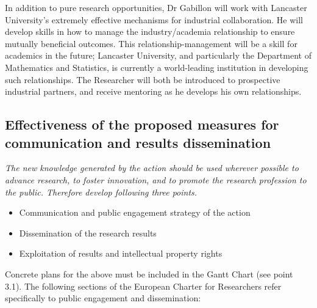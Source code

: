 \documentclass[a4paper,11pt]{article}
\begin{document}
In addition to pure research opportunities, Dr Gabillon will work with Lancaster University's extremely effective mechanisms for industrial collaboration.  He will develop skills in how to manage the industry/academia relationship to ensure mutually beneficial outcomes.  This relationship-management will be a skill for academics in the future; Lancaster University, and particularly the Department of Mathematics and Statistics, is currently a world-leading institution in developing such relationships.  The Researcher will both be introduced to prospective industrial partners, and receive mentoring as he develops his own relationships.


\subsection{Effectiveness of the proposed measures for communication and results dissemination}

{\em
The new knowledge generated by the action should be used wherever possible to advance research, to foster innovation, and to promote the research profession to the public. Therefore develop following three points.
\begin{itemize}
\item Communication and public engagement strategy of the action
\item Dissemination of the research results
\item Exploitation of results and intellectual property rights
\end{itemize}
Concrete plans for the above must be included in the Gantt Chart (see point 3.1).
The following sections of the European Charter for Researchers refer specifically to public engagement and dissemination:

}
\end{document}

